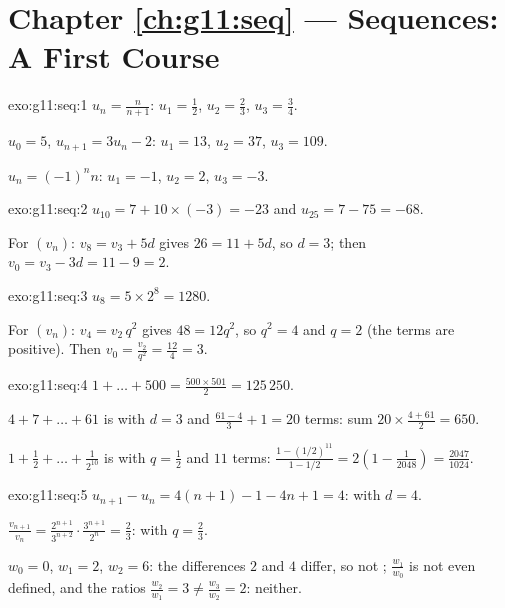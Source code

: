 \section*{Chapter \ref{ch:g11:seq} --- Sequences: A First Course}

\begin{solution}{exo:g11:seq:1}
$u_n = \frac{n}{n+1}$: $u_1 = \frac12$, $u_2 = \frac23$,
$u_3 = \frac34$.

$u_0 = 5$, $u_{n+1} = 3u_n - 2$: $u_1 = 13$, $u_2 = 37$, $u_3 = 109$.

$u_n = (-1)^n n$: $u_1 = -1$, $u_2 = 2$, $u_3 = -3$.
\end{solution}

\begin{solution}{exo:g11:seq:2}
$u_{10} = 7 + 10 \times (-3) = -23$ and $u_{25} = 7 - 75 = -68$.

For $(v_n)$: $v_8 = v_3 + 5d$ gives $26 = 11 + 5d$, so $d = 3$; then
$v_0 = v_3 - 3d = 11 - 9 = 2$.
\end{solution}

\begin{solution}{exo:g11:seq:3}
$u_8 = 5 \times 2^8 = 1280$.

For $(v_n)$: $v_4 = v_2\, q^2$ gives $48 = 12 q^2$, so $q^2 = 4$ and
$q = 2$ (the terms are positive). Then
$v_0 = \frac{v_2}{q^2} = \frac{12}{4} = 3$.
\end{solution}

\begin{solution}{exo:g11:seq:4}
$1 + \dots + 500 = \frac{500 \times 501}{2} = 125\,250$.

$4 + 7 + \dots + 61$ is  with $d = 3$ and
$\frac{61 - 4}{3} + 1 = 20$ terms: sum
$20 \times \frac{4 + 61}{2} = 650$.

$1 + \frac12 + \dots + \frac{1}{2^{10}}$ is  with $q = \frac12$
and $11$ terms:
$\frac{1 - (1/2)^{11}}{1 - 1/2} = 2\left(1 - \frac{1}{2048}\right)
= \frac{2047}{1024}$.
\end{solution}

\begin{solution}{exo:g11:seq:5}
$u_{n+1} - u_n = 4(n+1) - 1 - 4n + 1 = 4$:  with $d = 4$.

$\frac{v_{n+1}}{v_n} = \frac{2^{n+1}}{3^{n+2}} \cdot \frac{3^{n+1}}{2^n}
= \frac23$:  with $q = \frac23$.

$w_0 = 0$, $w_1 = 2$, $w_2 = 6$: the differences $2$ and $4$ differ, so
not ; $\frac{w_1}{w_0}$ is not even defined, and the ratios
$\frac{w_2}{w_1} = 3 \neq \frac{w_3}{w_2} = 2$: neither.
\end{solution}

